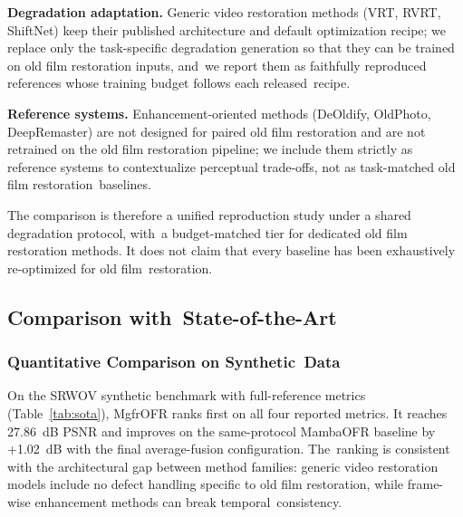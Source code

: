\documentclass[symmetry,article,accept,pdftex,moreauthors]{Definitions/mdpi}
\begin{document}
\textbf{Degradation adaptation.} Generic video restoration methods (VRT, RVRT, ShiftNet) keep their published architecture and default optimization recipe; we replace only the task-specific degradation generation so that they can be trained on old film restoration inputs, and~we report them as faithfully reproduced references whose training budget follows each released~recipe.

\textbf{Reference systems.} Enhancement-oriented methods (DeOldify, OldPhoto, DeepRemaster) are not designed for paired old film restoration and are not retrained on the old film restoration pipeline; we include them strictly as reference systems to contextualize perceptual trade-offs, not as task-matched old film restoration~baselines.

The comparison is therefore a unified reproduction study under a shared degradation protocol, with~a budget-matched tier for dedicated old film restoration methods. It does not claim that every baseline has been exhaustively re-optimized for old film~restoration.

\subsection{Comparison with~State-of-the-Art}
\label{subsec:comparison_sota}


\subsubsection{Quantitative Comparison on Synthetic~Data}

On the SRWOV synthetic benchmark with full-reference metrics (Table~\ref{tab:sota}), MgfrOFR ranks first on all four reported metrics. It reaches 27.86~dB PSNR and improves on the same-protocol MambaOFR baseline by +1.02~dB with the final average-fusion configuration. The~ranking is consistent with the architectural gap between method families: generic video restoration models include no defect handling specific to old film restoration, while frame-wise enhancement methods can break temporal~consistency.
\end{document}
